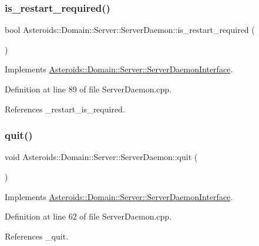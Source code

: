 \subsubsection{\texorpdfstring{is\+\_\+restart\+\_\+required()}{is\_restart\_required()}}
{\footnotesize\ttfamily bool Asteroids\+::\+Domain\+::\+Server\+::\+Server\+Daemon\+::is\+\_\+restart\+\_\+required (\begin{DoxyParamCaption}{ }\end{DoxyParamCaption})\hspace{0.3cm}{\ttfamily [virtual]}}



Implements \hyperlink{classAsteroids_1_1Domain_1_1Server_1_1ServerDaemonInterface_a6296fbd5a6d327794f7692adf5290d9e}{Asteroids\+::\+Domain\+::\+Server\+::\+Server\+Daemon\+Interface}.



Definition at line 89 of file Server\+Daemon.\+cpp.



References \+\_\+restart\+\_\+is\+\_\+required.

\mbox{\label{classAsteroids_1_1Domain_1_1Server_1_1ServerDaemon_a92d9ded3d37ff875f13172b3b175d176}} 
\subsubsection{\texorpdfstring{quit()}{quit()}}
{\footnotesize\ttfamily void Asteroids\+::\+Domain\+::\+Server\+::\+Server\+Daemon\+::quit (\begin{DoxyParamCaption}{ }\end{DoxyParamCaption})\hspace{0.3cm}{\ttfamily [virtual]}}



Implements \hyperlink{classAsteroids_1_1Domain_1_1Server_1_1ServerDaemonInterface_a84b60c3467a1545cb24ec9556ccf707e}{Asteroids\+::\+Domain\+::\+Server\+::\+Server\+Daemon\+Interface}.



Definition at line 62 of file Server\+Daemon.\+cpp.



References \+\_\+quit.

